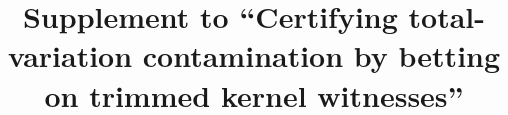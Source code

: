 \documentclass[aos]{imsart}
\begin{document}
\begin{frontmatter}
\title{Supplement to ``Certifying total-variation contamination by betting on trimmed kernel witnesses''}

\begin{aug}
\author[A]{~}
\address[A]{Departamento de Matem\'aticas, Universidad Aut\'onoma de Madrid}
\end{aug}

\begin{abstract}

\end{abstract}

\end{frontmatter}










\FloatBarrier

\end{document}

